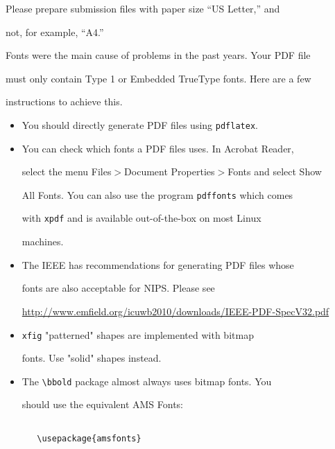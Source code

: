 \documentclass{article}
\begin{document}
Please prepare submission files with paper size ``US Letter,'' and

not, for example, ``A4.''



Fonts were the main cause of problems in the past years. Your PDF file

must only contain Type 1 or Embedded TrueType fonts. Here are a few

instructions to achieve this.



\begin{itemize}



\item You should directly generate PDF files using \verb+pdflatex+.



\item You can check which fonts a PDF files uses.  In Acrobat Reader,

  select the menu Files$>$Document Properties$>$Fonts and select Show

  All Fonts. You can also use the program \verb+pdffonts+ which comes

  with \verb+xpdf+ and is available out-of-the-box on most Linux

  machines.



\item The IEEE has recommendations for generating PDF files whose

  fonts are also acceptable for NIPS. Please see

  \url{http://www.emfield.org/icuwb2010/downloads/IEEE-PDF-SpecV32.pdf}



\item \verb+xfig+ "patterned" shapes are implemented with bitmap

  fonts.  Use "solid" shapes instead.



\item The \verb+\bbold+ package almost always uses bitmap fonts.  You

  should use the equivalent AMS Fonts:

\begin{verbatim}

   \usepackage{amsfonts}

\end{verbatim}


\end{itemize}
\end{document}
